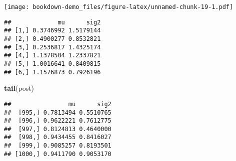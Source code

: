 \documentclass[]{book}
\newenvironment{Shaded}{\begin{snugshade}}{\end{snugshade}}
\newcommand{\KeywordTok}[1]{\textcolor[rgb]{0.13,0.29,0.53}{\textbf{#1}}}
\newcommand{\DataTypeTok}[1]{\textcolor[rgb]{0.13,0.29,0.53}{#1}}
\newcommand{\DecValTok}[1]{\textcolor[rgb]{0.00,0.00,0.81}{#1}}
\newcommand{\FloatTok}[1]{\textcolor[rgb]{0.00,0.00,0.81}{#1}}
\newcommand{\OtherTok}[1]{\textcolor[rgb]{0.56,0.35,0.01}{#1}}
\newcommand{\OperatorTok}[1]{\textcolor[rgb]{0.81,0.36,0.00}{\textbf{#1}}}
\newcommand{\NormalTok}[1]{#1}
\begin{document}
\begin{Shaded}
\end{Shaded}

\texttt{[image: bookdown-demo\_files/figure-latex/unnamed-chunk-19-1.pdf]}

\begin{Shaded}
\end{Shaded}

\begin{verbatim}
##             mu      sig2
## [1,] 0.3746992 1.5179144
## [2,] 0.4900277 0.8532821
## [3,] 0.2536817 1.4325174
## [4,] 1.1378504 1.2337821
## [5,] 1.0016641 0.8409815
## [6,] 1.1576873 0.7926196
\end{verbatim}

\begin{Shaded}
\begin{Highlighting}[]
\KeywordTok{tail}\NormalTok{(post)}
\end{Highlighting}
\end{Shaded}

\begin{verbatim}
##                mu      sig2
##  [995,] 0.7813494 0.5510765
##  [996,] 0.9622221 0.7612775
##  [997,] 0.8124813 0.4640000
##  [998,] 0.9434455 0.8416027
##  [999,] 0.9085257 0.8193501
## [1000,] 0.9411790 0.9053170
\end{verbatim}
\end{document}
